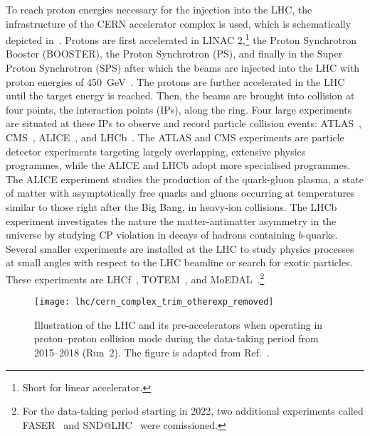 To reach proton energies necessary for the injection into the LHC, the
infrastructure of the CERN accelerator complex is used, which is schematically
depicted in~. Protons are first accelerated
in LINAC 2,\footnote{Short for linear accelerator.} the Proton Synchrotron
Booster (BOOSTER), the Proton Synchrotron (PS), and finally in the Super Proton
Synchrotron (SPS) after which the beams are injected into the LHC with proton
energies of \SI{450}{\GeV}~\cite{Evans:2008zzb}. The protons are further
accelerated in the LHC until the target energy is reached. Then, the beams are
brought into collision at four points, the interaction points (IPs), along the
ring. Four large experiments are situated at these IPs to observe and record
particle collision events: ATLAS~\cite{PERF-2007-01}, CMS~\cite{CMS-CMS-00-001},
ALICE~\cite{ALICE:2008ngc}, and LHCb~\cite{LHCb:2008vvz}. The ATLAS and CMS
experiments are particle detector experiments targeting largely overlapping,
extensive physics programmes, while the ALICE and LHCb adopt more specialised
programmes. The ALICE experiment studies the production of the quark-gluon
plasma, a state of matter with asymptotically free quarks and gluons occurring
at temperatures similar to those right after the Big Bang, in heavy-ion
collisions. The LHCb experiment investigates the nature the matter-antimatter
asymmetry in the universe by studying CP violation in decays of hadrons
containing $b$-quarks. Several smaller experiments are installed at the LHC to
study physics processes at small angles with respect to the LHC beamline or
search for exotic particles. These experiments are LHCf~\cite{LHCf:2008lfy},
TOTEM~\cite{TOTEM:2008lue}, and MoEDAL~\cite{MoEDAL:2009jwa}.\footnote{For the
  data-taking period starting in 2022, two additional experiments called
  FASER~\cite{FASER:2019aik} and SND@LHC~\cite{Boyarsky:2021moj} were
  comissioned.}


\begin{figure}[htbp]
  \centering

  \texttt{[image: lhc/cern\_complex\_trim\_otherexp\_removed]}

  \caption{Illustration of the LHC and its pre-accelerators when operating in
    proton--proton collision mode during the data-taking period from 2015--2018
    (Run~2). The figure is adapted from Ref.~\cite{Mobs:2684277}.}%
  \label{fig:cern_accelerator_complex}
\end{figure}

